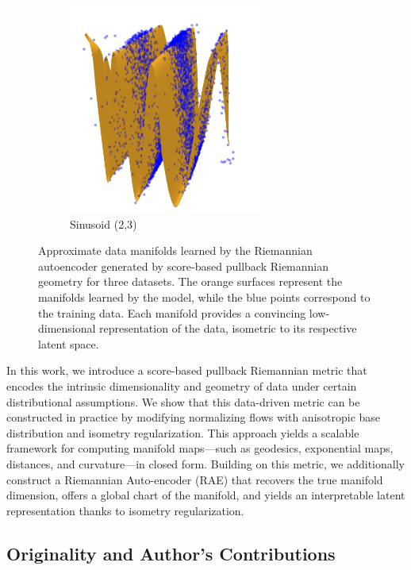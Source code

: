 \begin{figure}[h]
\begin{subfigure}[b]{0.32\textwidth}
        \centering
        \includegraphics[width=0.7\textwidth]{Outline/figures/score-based-riemannian-geometry/sinusoid_2_3.jpg}
        \caption{Sinusoid (2,3)}
    \end{subfigure}

    \caption{
        Approximate data manifolds learned by the Riemannian autoencoder generated by score-based pullback Riemannian geometry for three datasets. The orange surfaces represent the manifolds learned by the model, while the blue points correspond to the training data. Each manifold provides a convincing low-dimensional representation of the data, isometric to its respective latent space.
    }
    \label{fig:learned_charts}
\end{figure}

In this work, we introduce a score-based pullback Riemannian metric that encodes the intrinsic dimensionality and geometry of data under certain distributional assumptions. We show that this data-driven metric can be constructed in practice by modifying normalizing flows with anisotropic base distribution and isometry regularization. This approach yields a scalable framework for computing manifold maps—such as geodesics, exponential maps, distances, and curvature—in closed form. Building on this metric, we additionally construct a Riemannian Auto-encoder (RAE) that recovers the true manifold dimension, offers a global chart of the manifold, and yields an interpretable latent representation thanks to isometry regularization.

\subsection*{Originality and Author’s Contributions}

